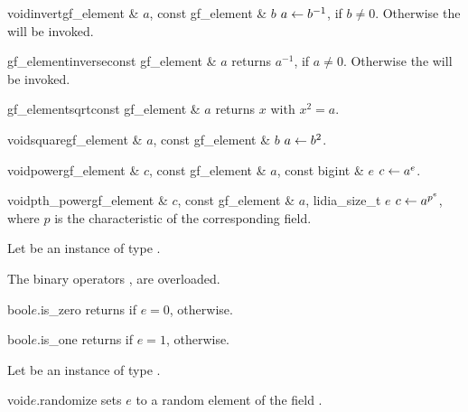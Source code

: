 \begin{fcode}{void}{invert}{gf_element & $a$, const gf_element & $b$}
  $a \leftarrow b^{-1}$, if $b \neq 0$.  Otherwise the \LEH will be invoked.
\end{fcode}

\begin{fcode}{gf_element}{inverse}{const gf_element & $a$}
  returns $a^{-1}$, if $a \neq 0$.  Otherwise the \LEH will be invoked.
\end{fcode}

\begin{fcode}{gf_element}{sqrt}{const gf_element & $a$}
  returns $x$ with $x^2 = a$.
\end{fcode}

\begin{fcode}{void}{square}{gf_element & $a$, const gf_element & $b$}
  $a \leftarrow b^2$.
\end{fcode}

\begin{fcode}{void}{power}{gf_element & $c$, const gf_element & $a$, const bigint & $e$}
  $c \leftarrow a^e$.
\end{fcode}

\begin{fcode}{void}{pth_power}{gf_element & $c$, const gf_element & $a$, lidia_size_t $e$}
  $c \leftarrow a^{p^e}$, where $p$ is the characteristic of the corresponding field.
\end{fcode}



\COMP

Let  be an instance of type .

The  binary operators \code{==},  \code{!=} are overloaded.

\begin{cfcode}{bool}{$e$.is_zero}{}
  returns \TRUE if $e = 0$, \FALSE otherwise.
\end{cfcode}

\begin{cfcode}{bool}{$e$.is_one}{}
  returns \TRUE if $e = 1$, \FALSE otherwise.
\end{cfcode}



\BASIC

Let  be an instance of type .

\begin{fcode}{void}{$e$.randomize}{}
  sets $e$ to a random element of the field .
\end{fcode}

